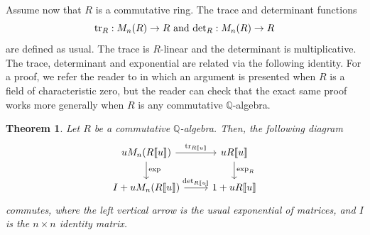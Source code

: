 \documentclass[11pt]{amsart}
\newtheorem{theorem}{Theorem}[section]
\numberwithin{equation}{section}
\theoremstyle{remark}
\theoremstyle{definition}
\begin{document}
Assume now that $R$ is a commutative ring.  The trace and determinant functions
$${\rm tr}_{R}:M_{n}(R) \rightarrow R \text{ and } {\rm det}_{R}:M_{n}(R) \rightarrow R $$
are defined as usual.  The trace is $R$-linear and the determinant is multiplicative.  The trace, determinant and exponential are related via the following identity.  For a proof, we refer the reader to \cite[Theorem 9.2]{Sambale:2023} in which an argument is presented when $R$ is a field of characteristic zero, but the reader can check that the exact same proof works more generally when $R$ is any commutative $\mathbb{Q}$-algebra.
\begin{theorem} \label{det_tr_exp}
Let $R$ be a commutative $\mathbb{Q}$-algebra.  Then, the following diagram
\begin{equation*}
\begin{tikzcd}
uM_{n}(R\llbracket u \rrbracket) \arrow["{\rm exp}",d] \arrow["{\rm tr}_{R\llbracket u \rrbracket}",r] & uR \llbracket u \rrbracket \arrow["{\rm exp}_{R}",d]\\
I+uM_{n}(R\llbracket u \rrbracket) \arrow["{\rm det}_{R\llbracket u \rrbracket}",r] & 1+ uR \llbracket u \rrbracket
\end{tikzcd}
\end{equation*}
commutes, where the left vertical arrow is the usual exponential of matrices, and $I$ is the $n\times n$ identity matrix.
\end{theorem} 
\end{document}

